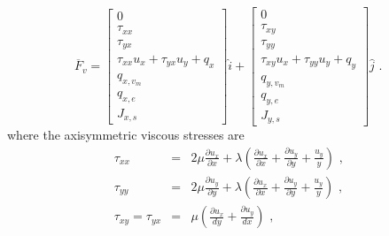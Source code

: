 \begin{equation}
 \overline{F}_{v} = \left [ \begin{array}{c} 
                                0 \\
                                \tau_{xx} \\
                                \tau_{yx} \\
                                \tau_{xx} u_{x} + \tau_{yx} u_{y} + q_{x} \\
                                q_{x,v_{m}} \\
                                q_{x,e} \\
                                J_{x,s}
                            \end{array} \right ] \hat{i} 
                   + \left [ \begin{array}{c}
                                 0 \\
                                 \tau_{xy} \\
                                 \tau_{yy} \\
                                 \tau_{xy} u_{x} + \tau_{yy} u_{y} + q_{y} \\
                                 q_{y,v_{m}} \\
                                 q_{y,e} \\
                                 J_{y,s}
                             \end{array} \right ] \hat{j} \text{ . }
 \label{eq:F_v}
\end{equation}
where the axisymmetric viscous stresses are
\begin{eqnarray}
 \tau_{xx} &=& 2 \mu \frac{\partial u_{x} }{\partial x} 
               + \lambda \left ( \frac{\partial u_{x}}{\partial x} 
                                 + \frac{\partial u_{y}}{\partial y} 
                                 + \frac{u_{y}}{y} \right ) \text{ , } \nonumber \\
 \tau_{yy} &=& 2 \mu \frac{\partial u_{y} }{\partial y} 
               + \lambda \left ( \frac{\partial u_{x}}{\partial x} 
                                 + \frac{\partial u_{y}}{\partial y} 
                                 + \frac{u_{y}}{y} \right ) \text{ , } \nonumber \\
 \tau_{xy} = \tau_{yx} &=& \mu \left ( \frac{\partial u_{x}}{dy} 
                                     + \frac{\partial u_{y}}{dx} \right ) \text{ , }
 \label{eq:taus}
\end{eqnarray}
